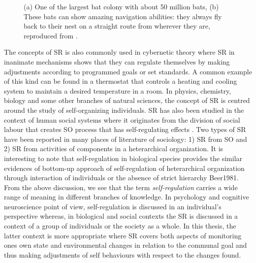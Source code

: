 \begin{figure}[htp]
\centering
{} 
\hspace{0.25cm}
\caption{(a) One of the largest bat colony with about 50 million bats, (b) These bats can show amazing navigation abilities: they always fly back to their nest on a straight route from wherever they are, reproduced from \protect{}.}
\label{fig:bats-colony}
\end{figure}
The concepts of SR is also commonly used in cybernetic theory where SR in inanimate mechanisms shows that they can regulate themselves by making adjustments according to programmed goals or set standards. A common example of this kind can be found in a thermostat that controls a heating and cooling system to maintain a desired temperature in a room. In physics, chemistry, biology and some other branches of natural sciences, the concept of SR is centred around the study of self-organizing individuals. SR has also been studied in the context of human social systems where it originates from the division of social labour that creates SO process that has self-regulating effects \cite{Kppers+1990}. Two types of SR have been reported in many places of literature of sociology: 1) SR from SO and 2) SR from activities of components in a heterarchical organization. It is interesting to note that self-regulation in biological species provides the similar evidences of bottom-up approach of self-regulation of heterarchical organization through interaction of individuals or the absence of strict hierarchy {Beer1981}.\\ 
From the above discussion, we see that the term {\em self-regulation} carries a wide range of meaning in different branches of knowledge. In psychology and cognitive neuroscience point of view, self-regulation is discussed in an individual's perspective whereas, in biological and social contexts the SR is discussed in a context of a group of individuals or the society as a whole. In  this thesis, the latter context is more appropriate where  SR covers both aspects of monitoring ones own state and environmental changes in relation to the communal goal and thus making adjustments of self behaviours with respect to the changes found.
